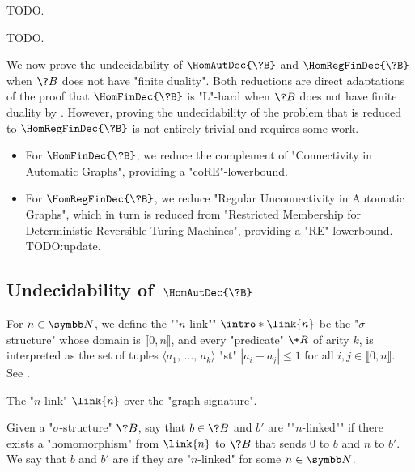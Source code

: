 
TODO.


TODO.

We now prove the undecidability of $\HomAutDec{\?B}$ and $\HomRegFinDec{\?B}$
when $\?B$ does not have "finite duality". Both reductions are
direct adaptations of the proof that $\HomFinDec{\?B}$ is "L"-hard when $\?B$ does not
have finite duality by \textcite[Theorem 3.2]{LaroseTesson2009UniversalAlgebraCSP}.
However, proving the undecidability of the problem that is reduced
to $\HomRegFinDec{\?B}$ is not entirely trivial and requires some work.
\begin{itemize}
	\item For $\HomFinDec{\?B}$, we reduce the complement of "Connectivity in Automatic Graphs",
		providing a "coRE"-lowerbound.
	\item For $\HomRegFinDec{\?B}$, we reduce "Regular Unconnectivity in Automatic Graphs",
		which in turn is reduced from "Restricted Membership for Deterministic Reversible Turing Machines", providing a "RE"-lowerbound. TODO:update.
\end{itemize}

\subsection{\AP\label{sec:undecidability-hom}%
	Undecidability of \,$\HomAutDec{\?B}$}

For $n\in\N$, we define the \AP""$n$-link"" $\intro*\link{n}$ be the "$\sigma$-structure" 
whose domain is $\lBrack 0,n\rBrack$, and every "predicate" $\+R$
of arity $k$, is interpreted as the set of tuples $\langle a_1,\, \hdots,\, a_k \rangle$
"st" $|a_i-a_j| \leq 1$ for all $i,j \in \lBrack 0,n \rBrack$. See .
\begin{marginfigure}
	\centering
	\begin{tikzpicture}
		
	\end{tikzpicture}
	\caption{\AP\label{fig:n-link}The "$n$-link" $\link{n}$ over the "graph signature".}
\end{marginfigure}
Given a "$\sigma$-structure" $\?B$, say that $b \in \?B$ and $b'$ are
\AP""$n$-linked"" if there exists a "homomorphism" from $\link{n}$ to $\?B$
that sends $0$ to $b$ and $n$ to $b'$. We say that $b$ and $b'$ are \AP{} if
they are "$n$-linked" for some $n \in \N$.

